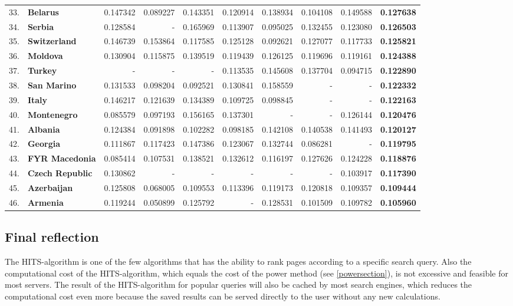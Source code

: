 \documentclass[a4paper,11pt]{report}
\begin{document}
\begin{landscape}
\begin{longtable}{r l | r | r | r | r | r | r | r | r}
33.&\textbf{Belarus}&0.147342&0.089227&0.143351&0.120914&0.138934&0.104108&0.149588&\textbf{0.127638}\\
34.&\textbf{Serbia}&0.128584&-&0.165969&0.113907&0.095025&0.132455&0.123080&\textbf{0.126503}\\
35.&\textbf{Switzerland}&0.146739&0.153864&0.117585&0.125128&0.092621&0.127077&0.117733&\textbf{0.125821}\\
36.&\textbf{Moldova}&0.130904&0.115875&0.139519&0.119439&0.126125&0.119696&0.119161&\textbf{0.124388}\\
37.&\textbf{Turkey}&-&-&-&0.113535&0.145608&0.137704&0.094715&\textbf{0.122890}\\
38.&\textbf{San Marino}&0.131533&0.098204&0.092521&0.130841&0.158559&-&-&\textbf{0.122332}\\
39.&\textbf{Italy}&0.146217&0.121639&0.134389&0.109725&0.098845&-&-&\textbf{0.122163}\\
40.&\textbf{Montenegro}&0.085579&0.097193&0.156165&0.137301&-&-&0.126144&\textbf{0.120476}\\
41.&\textbf{Albania}&0.124384&0.091898&0.102282&0.098185&0.142108&0.140538&0.141493&\textbf{0.120127}\\
42.&\textbf{Georgia}&0.111867&0.117423&0.147386&0.123067&0.132744&0.086281&-&\textbf{0.119795}\\
43.&\textbf{FYR Macedonia}&0.085414&0.107531&0.138521&0.132612&0.116197&0.127626&0.124228&\textbf{0.118876}\\
44.&\textbf{Czech Republic}&0.130862&-&-&-&-&-&0.103917&\textbf{0.117390}\\
45.&\textbf{Azerbaijan}&0.125808&0.068005&0.109553&0.113396&0.119173&0.120818&0.109357&\textbf{0.109444}\\
46.&\textbf{Armenia}&0.119244&0.050899&0.125792&-&0.128531&0.101509&0.109782&\textbf{0.105960}\end{longtable}\label{thub}
\end{landscape}
\subsection{Final reflection}
The HITS-algorithm is one of the few algorithms that has the ability to rank pages according to a specific search 
query.
Also the computational cost of the HITS-algorithm, which equals the cost of 
the power method (see \ref{powersection}), is not excessive and feasible for most servers. 
The result of the HITS-algorithm for popular queries will also be cached by most 
search engines, which reduces the computational cost even more because the saved results can be served
directly to the user without any new calculations. 
\end{document}
